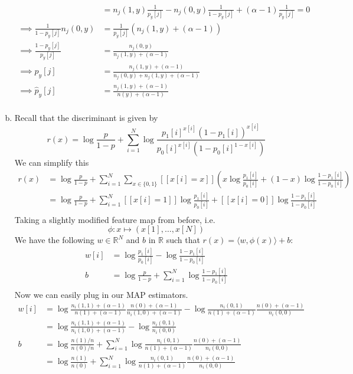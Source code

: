 \documentclass{amsart}
\newcommand{\rr}{\mathbb{R}}    %
\theoremstyle{definition}
\begin{document}
\begin{enumerate}[(a)]
\begin{align*}
			&= n_j(1,y)\frac{1}{p_y[j]} - n_j(0,y)\frac{1}{1-p_y[j]} + (\alpha - 1)\frac{1}{p_{y}[j]} = 0\\
			\implies \frac{1}{1-p_y[j]}n_j(0,y)&= \frac{1}{p_y[j]}(n_j(1,y) + (\alpha - 1)) \\
			\implies \frac{1-p_y[j]}{p_y[j]} &= \frac{n_j(0, y)}{n_j(1, y) + (\alpha - 1)}\\
			\implies p_y[j] &= \frac{n_j(1,y) + (\alpha - 1)}{n_j(0, y) + n_j(1, y) + (\alpha - 1)}\\
			\implies \hat{p}_y[j]&= \frac{n_j(1,y) + (\alpha - 1)}{n(y) + (\alpha - 1)}\\
		\end{align*}
	\item
		Recall that the discriminant is given by 
		\[r(x) = \log \frac{p}{1-p} + \sum_{i=1}^{N} \log\frac{p_1[i]^{x[i]}(1-p_1[i])^{x[i]}}{p_0[i]^{x[i]}(1-p_0[i]^{1-x[i]})}\]
		We can simplify this
		\begin{align*}
			r(x) &= \log \frac{p}{1-p} + \sum_{i=1}^{N} \sum_{x \in \{0,1\}} [[x[i] = x]]\left(x\log\frac{p_1[i]}{p_0[i]} + (1-x)\log\frac{1-p_1[i]}{1-p_0[i]}\right)\\
			&= \log \frac{p}{1-p} + \sum_{i=1}^{N} [[x[i] = 1]]\log\frac{p_1[i]}{p_0[i]} + [[x[i] = 0]]\log\frac{1-p_1[i]}{1-p_0[i]}\\
		\end{align*}
		Taking a slightly modified feature map from before, i.e. 
		\[\phi: x\mapsto (x[1], \ldots, x[N])\]
		We have the following $w \in \rr^N$ and $b$ in $\rr$ such that $r(x) = \langle w, \phi(x)\rangle + b$:
		\begin{align*}
			w[i] &= \log \frac{p_1[i]}{p_0[i]} - \log \frac{1-p_1[i]}{1 - p_0[i]}\\
			b &= \log\frac{p}{1-p} + \sum_{i = 1}^{N} \log \frac{1-p_1[i]}{1 - p_0[i]}\\
		\end{align*}
		Now we can easily plug in our MAP estimators. 
		\begin{align*}
			w[i] &= \log \frac{n_i(1,1) + (\alpha - 1)}{n(1) + (\alpha - 1)} \frac{n(0) + (\alpha-1)}{n_i(1,0) + (\alpha - 1)} - \log \frac{n_i(0,1)}{n(1) + (\alpha - 1)} \frac{n(0) + (\alpha - 1)}{n_i(0,0)}\\
			&= \log \frac{n_i(1,1) + (\alpha - 1)}{n_i(1,0) + (\alpha - 1)} - \log \frac{n_i(0,1)}{n_i(0,0)}\\
			b &= \log\frac{n(1)/n}{n(0)/n} + \sum_{i = 1}^{N} \log \frac{n_i(0,1)}{n(1) + (\alpha - 1)}\frac{n(0) + (\alpha -1)}{n_i(0,0)}\\
			&= \log\frac{n(1)}{n(0)} + \sum_{i = 1}^{N} \log \frac{n_i(0,1)}{n(1) + (\alpha - 1)}\frac{n(0) + (\alpha -1)}{n_i(0,0)}\\
		\end{align*}
\end{enumerate}
\end{document}
